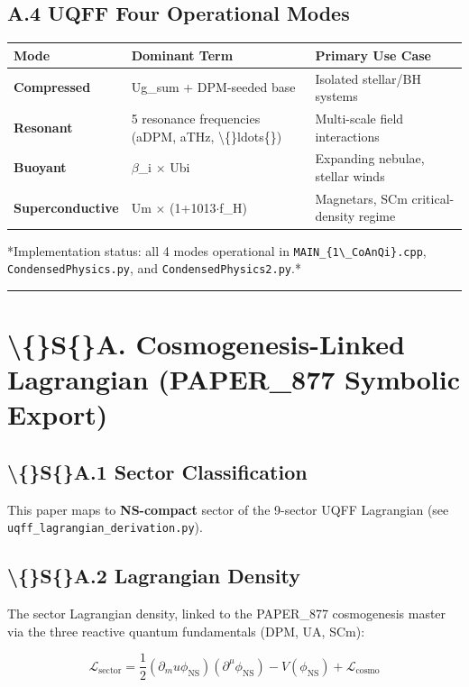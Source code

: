 \documentclass[11pt]{article}
\begin{document}
\subsection*{A.4 UQFF Four Operational Modes}

\begin{center}
\begin{longtable}{lll}
\toprule
Mode & Dominant Term & Primary Use Case \tabularnewline
\midrule
\endhead
\textbf{Compressed} & Ug\_sum + DPM-seeded base & Isolated stellar/BH systems \tabularnewline
\textbf{Resonant} & 5 resonance frequencies (aDPM, aTHz, \textbackslash\{\}ldots\{\}) & Multi-scale field interactions \tabularnewline
\textbf{Buoyant} & $\beta$\_i $\times$ Ubi & Expanding nebulae, stellar winds \tabularnewline
\textbf{Superconductive} & Um $\times$ (1+1013$\cdot$f\_H) & Magnetars, SCm critical-density regime \tabularnewline
\bottomrule
\end{longtable}
\end{center}

*Implementation status: all 4 modes operational in \verb|MAIN_{1\_CoAnQi}.cpp|, \verb|CondensedPhysics.py|, and \verb|CondensedPhysics2.py|.*

\noindent\rule{\textwidth}{0.4pt}

\section*{\textbackslash\{\}S\{\}A. Cosmogenesis-Linked Lagrangian (PAPER\_877 Symbolic Export)}

\subsection*{\textbackslash\{\}S\{\}A.1 Sector Classification}

This paper maps to \textbf{NS-compact} sector of the 9-sector UQFF Lagrangian (see \verb|uqff_lagrangian_derivation.py|).

\subsection*{\textbackslash\{\}S\{\}A.2 Lagrangian Density}

The sector Lagrangian density, linked to the PAPER\_877 cosmogenesis master via the three reactive quantum fundamentals (DPM, UA, SCm):

$$\mathcal{L}_{\mathrm{sector}} = \frac{1}{2}(\partial_mu \phi_{\mathrm{NS}})(\partial^\mu \phi_{\mathrm{NS}}) - V(\phi_{\mathrm{NS}}) + \mathcal{L}_{\mathrm{cosmo}}$$
\end{document}
